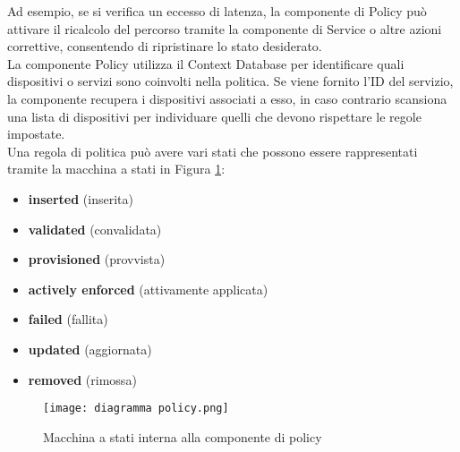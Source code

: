 Ad esempio, se si verifica un eccesso di latenza, la componente di Policy può attivare il ricalcolo del percorso tramite la componente di Service o altre azioni correttive,
consentendo di ripristinare lo stato desiderato.
\\La componente Policy utilizza il Context Database per identificare quali dispositivi o servizi sono coinvolti nella politica.
Se viene fornito l'ID del servizio, la componente recupera i dispositivi associati a esso, in caso contrario scansiona una lista di dispositivi per individuare quelli che devono rispettare le regole impostate. 
\\Una regola di politica può avere vari stati che possono essere rappresentati tramite la macchina a stati in Figura \ref{fig:diagramma}:
\begin{itemize}
    \item \textbf{inserted} (inserita)
    \item \textbf{validated} (convalidata)
    \item \textbf{provisioned} (provvista)
    \item \textbf{actively enforced} (attivamente applicata)
    \item \textbf{failed} (fallita)
    \item \textbf{updated} (aggiornata)
    \item \textbf{removed} (rimossa)
\end{itemize}
\begin{figure}[h]
    \centering
   \texttt{[image: diagramma policy.png]}
    \caption{Macchina a stati interna alla componente di policy \cite{D32}}
    \label{fig:diagramma}
\end{figure}
